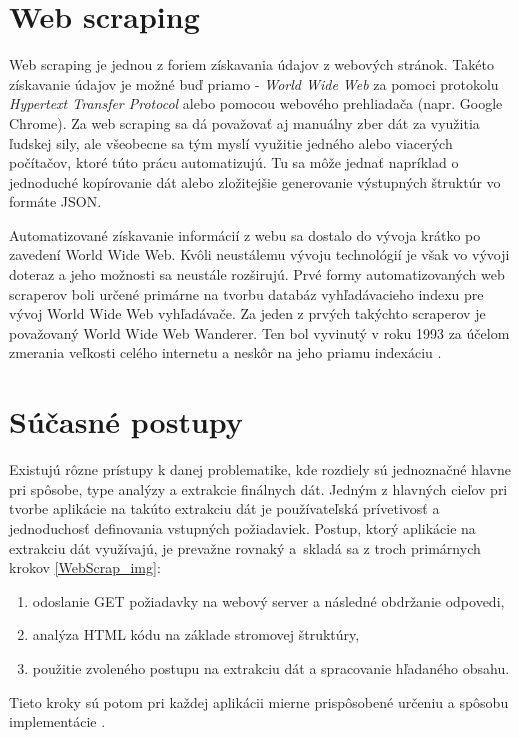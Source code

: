 \section{Web scraping}

Web scraping je jednou z foriem získavania údajov z webových stránok. Takéto získavanie údajov je možné buď priamo - \textit{World Wide Web} za pomoci protokolu \textit{Hypertext Transfer Protocol} alebo pomocou webového prehliadača (napr. Google Chrome). Za web scraping sa dá považovať aj manuálny zber dát za využitia ľudskej sily, ale všeobecne sa tým myslí využitie jedného alebo viacerých počítačov, ktoré túto prácu automatizujú. Tu sa môže jednať napríklad o jednoduché kopírovanie dát alebo zložitejšie generovanie výstupných štruktúr vo formáte JSON.

Automatizované získavanie informácií z webu sa dostalo do vývoja krátko po zavedení World Wide Web. Kvôli neustálemu vývoju technológií je však vo vývoji doteraz a jeho možnosti sa neustále rozširujú. Prvé formy automatizovaných web scraperov boli určené primárne na tvorbu databáz vyhľadávacieho indexu pre vývoj World Wide Web vyhľadávače. Za jeden z prvých takýchto scraperov je považovaný World Wide Web Wanderer. Ten bol vyvinutý v roku 1993 za účelom zmerania veľkosti celého internetu a neskôr na jeho priamu indexáciu \cite{online:how_does_scraping_work}. 

\section{Súčasné postupy}

Existujú rôzne prístupy k danej problematike, kde rozdiely sú jednoznačné hlavne pri spôsobe, type analýzy a extrakcie finálnych dát. Jedným z hlavných cieľov pri tvorbe aplikácie na takúto extrakciu dát je používateľská prívetivosť a jednoduchosť definovania vstupných požiadaviek. Postup, ktorý aplikácie na extrakciu dát využívajú, je prevažne rovnaký a~skladá sa z troch primárnych krokov \ref{WebScrap_img}:
\begin{enumerate}
  \item odoslanie GET požiadavky na webový server a následné obdržanie odpovedi,
  \item analýza HTML kódu na základe stromovej štruktúry,
  \item použitie zvoleného postupu na extrakciu dát a spracovanie hľadaného obsahu.
\end{enumerate}

Tieto kroky sú potom pri každej aplikácii mierne prispôsobené určeniu a spôsobu implementácie \cite{online:how_does_scraping_work}. 

